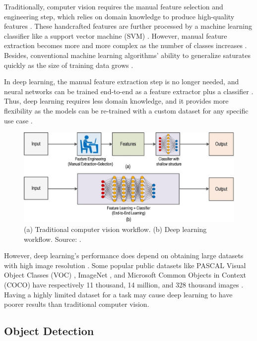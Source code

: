 \documentclass[a4paper, 11pt, oneside]{article}
\begin{document}
Traditionally, computer vision requires the manual feature selection and engineering step, which relies on domain knowledge
to produce high-quality features \cite{elgendy2020deep, zhao2019object, o2019deep}. These handcrafted features are further
processed by a machine learning classifier like a support vector machine (SVM)
\cite{elgendy2020deep, zhao2019object, o2019deep}. However, manual feature extraction becomes more and more complex as
the number of classes increases \cite{o2019deep}. Besides, conventional machine learning algorithms' ability to
generalize saturates quickly as the size of training data grows \cite{qin2015underwater}.

In deep learning, the manual feature extraction step is no longer needed, and neural networks can be trained end-to-end
as a feature extractor plus a classifier \cite{elgendy2020deep, o2019deep}. Thus, deep learning requires less domain
knowledge, and it provides more flexibility as the models can be re-trained with a custom dataset for any specific use
case \cite{o2019deep}.

\begin{figure}[ht]
  \begin{center}
    \includegraphics[width=.7\textwidth]{deep_learning_vs_traditional_computer_vision.png}
  \end{center}
  \caption{(a) Traditional computer vision workflow. (b) Deep learning workflow. Source: \cite{o2019deep}.}
\end{figure}

However, deep learning's performance does depend on obtaining large datasets with high image resolution \cite{o2019deep}.
Some popular public datasets like PASCAL Visual Object Classes (VOC) \cite{everingham2010pascal}, ImageNet
\cite{russakovsky2015imagenet}, and Microsoft Common Objects in Context (COCO) \cite{lin2014microsoft}
have respectively 11 thousand, 14 million, and 328 thousand images \cite{liu2020deep}. Having a highly limited dataset
for a task may cause deep learning to have poorer results than traditional computer vision.

\subsection{Object Detection}
\end{document}
